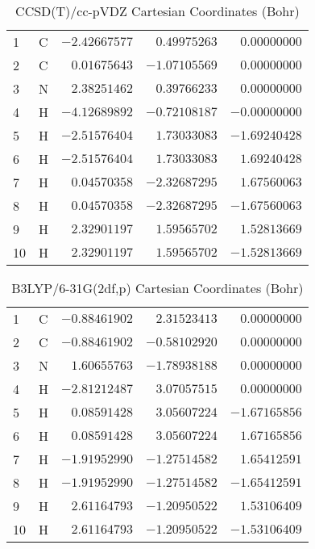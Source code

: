 \documentclass[10pt,oneside]{article}
\begin{document}
\begin{table}[h!]
\centering
\caption{CCSD(T)/cc-pVDZ Cartesian Coordinates (Bohr)}
\begin{tabular}{llrrr}
1  & C  & $-2.42667577$ & $ 0.49975263$ & $ 0.00000000$ \\
2  & C  & $ 0.01675643$ & $-1.07105569$ & $ 0.00000000$ \\
3  & N  & $ 2.38251462$ & $ 0.39766233$ & $ 0.00000000$ \\
4  & H  & $-4.12689892$ & $-0.72108187$ & $-0.00000000$ \\
5  & H  & $-2.51576404$ & $ 1.73033083$ & $-1.69240428$ \\
6  & H  & $-2.51576404$ & $ 1.73033083$ & $ 1.69240428$ \\
7  & H  & $ 0.04570358$ & $-2.32687295$ & $ 1.67560063$ \\
8  & H  & $ 0.04570358$ & $-2.32687295$ & $-1.67560063$ \\
9  & H  & $ 2.32901197$ & $ 1.59565702$ & $ 1.52813669$ \\
10 & H  & $ 2.32901197$ & $ 1.59565702$ & $-1.52813669$ \\
\end{tabular}
\end{table}

\begin{table}[h!]
\centering
\caption{B3LYP/6-31G(2df,p) Cartesian Coordinates (Bohr)}
\begin{tabular}{llrrr}
1  & C  & $-0.88461902$ & $ 2.31523413$ & $ 0.00000000$ \\
2  & C  & $-0.88461902$ & $-0.58102920$ & $ 0.00000000$ \\
3  & N  & $ 1.60655763$ & $-1.78938188$ & $ 0.00000000$ \\
4  & H  & $-2.81212487$ & $ 3.07057515$ & $ 0.00000000$ \\
5  & H  & $ 0.08591428$ & $ 3.05607224$ & $-1.67165856$ \\
6  & H  & $ 0.08591428$ & $ 3.05607224$ & $ 1.67165856$ \\
7  & H  & $-1.91952990$ & $-1.27514582$ & $ 1.65412591$ \\
8  & H  & $-1.91952990$ & $-1.27514582$ & $-1.65412591$ \\
9  & H  & $ 2.61164793$ & $-1.20950522$ & $ 1.53106409$ \\
10 & H  & $ 2.61164793$ & $-1.20950522$ & $-1.53106409$ \\
\end{tabular}
\end{table}
\end{document}
